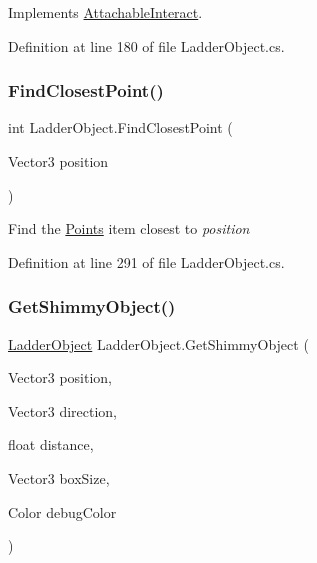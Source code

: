 Implements \mbox{\hyperlink{class_attachable_interact_a9b07a54f1dbb96777c4bd287dfe438e3}{Attachable\+Interact}}.



Definition at line 180 of file Ladder\+Object.\+cs.

\mbox{\label{class_ladder_object_aafddc5cca113a7d13673a778c6edb9ac}} 
\subsubsection{\texorpdfstring{Find\+Closest\+Point()}{FindClosestPoint()}}
{\footnotesize\ttfamily int Ladder\+Object.\+Find\+Closest\+Point (\begin{DoxyParamCaption}\item[{Vector3}]{position }\end{DoxyParamCaption})}



Find the \mbox{\hyperlink{class_ladder_object_a6d87f62a0637a961b199cbc46947f268}{Points}} item closest to {\itshape position}  



Definition at line 291 of file Ladder\+Object.\+cs.

\mbox{\label{class_ladder_object_a445278889295eecb94978527519a939d}} 
\subsubsection{\texorpdfstring{Get\+Shimmy\+Object()}{GetShimmyObject()}}
{\footnotesize\ttfamily \mbox{\hyperlink{class_ladder_object}{Ladder\+Object}} Ladder\+Object.\+Get\+Shimmy\+Object (\begin{DoxyParamCaption}\item[{Vector3}]{position,  }\item[{Vector3}]{direction,  }\item[{float}]{distance,  }\item[{Vector3}]{box\+Size,  }\item[{Color}]{debug\+Color }\end{DoxyParamCaption})}



